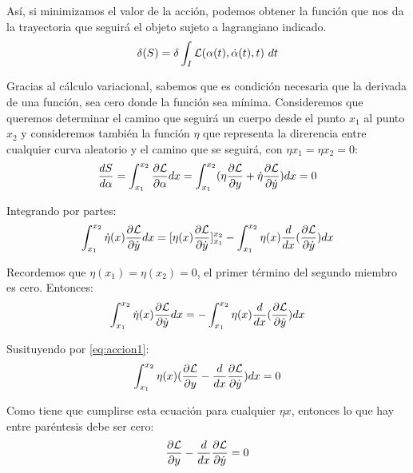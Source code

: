 Así, si minimizamos el valor de la acción, podemos obtener la función que nos da la trayectoria que seguirá el objeto sujeto a lagrangiano indicado.
\begin{equation}
    \delta(S) = \delta \int_{I}\mathcal{L}(\alpha(t), \dot{\alpha}(t), t)\ dt
\end{equation}

Gracias al cálculo variacional, sabemos que es condición necesaria que la derivada de una función, sea cero donde la función sea mínima. Consideremos que queremos determinar el camino que seguirá un cuerpo desde el punto $x_1$ al punto $x_2$ y consideremos también la función $\eta$ que representa la direrencia entre cualquier curva aleatorio y el camino que se seguirá, con $\eta{x_1} = \eta{x_2} = 0$:
\begin{equation}
    \label{eq:accion1}
    \frac{dS}{d\alpha} = \int_{x_1}^{x_2}\frac{\partial\mathcal{L}}{\partial\alpha}dx = \int_{x_1}^{x_2}(\eta\frac{\partial\mathcal{L}}{\partial y} + \dot{\eta}\frac{\partial\mathcal{L}}{\partial\dot{y}})dx = 0
\end{equation}

Integrando por partes:
\begin{equation}
    \int_{x_1}^{x_2}\dot{\eta}(x)\frac{\partial\mathcal{L}}{\partial\dot{y}}dx = [\eta(x)\frac{\partial\mathcal{L}}{\partial\dot{y}}]_{x_1}^{x_2} - \int_{x_1}^{x_2}\eta(x)\frac{d}{dx}(\frac{\partial\mathcal{L}}{\partial\dot{y}})dx
\end{equation}

Recordemos que $\eta(x_1) = \eta(x_2) = 0$, el primer término del segundo miembro es cero. Entonces:
\begin{equation}
    \int_{x_1}^{x_2}\dot{\eta}(x)\frac{\partial\mathcal{L}}{\partial\dot{y}}dx = - \int_{x_1}^{x_2}\eta(x)\frac{d}{dx}(\frac{\partial\mathcal{L}}{\partial\dot{y}})dx
\end{equation}

Susituyendo por \eqref{eq:accion1}:
\begin{equation}
    \int_{x_1}^{x_2}\eta(x)(\frac{\partial\mathcal{L}}{\partial y} - \frac{d}{dx}\frac{\partial\mathcal{L}}{\partial\dot{y}})dx = 0
\end{equation}

Como tiene que cumplirse esta ecuación para cualquier $\eta{x}$, entonces lo que hay entre paréntesis debe ser cero:
\begin{equation}
    \frac{\partial\mathcal{L}}{\partial y} - \frac{d}{dx}\frac{\partial\mathcal{L}}{\partial\dot{y}} = 0
\end{equation}

